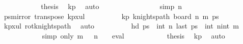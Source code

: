 \begin{isabellebody}
\ \ \ \ \ \ \ \ \isamarkupfalse%
\ \isamarkupfalse%
\ {\isacharquery}{\kern0pt}thesis\ \isamarkupfalse%
\ kp\ \isamarkupfalse%
\ auto\isanewline
\ \ \ \ \ \ \isamarkupfalse%
\isanewline
\ \ \ \ \ \ \ \ \isamarkupfalse%
\ {\isacharbrackleft}{\kern0pt}simp{\isacharbrackright}{\kern0pt}{\isacharcolon}{\kern0pt}\ {\isachardoublequoteopen}n\ {\isacharequal}{\kern0pt}\ {}{\isachardoublequoteclose}\isanewline
\ \ \ \ \ \ \ \ \isamarkupfalse%
\ {\isacharquery}{\kern0pt}ps{\isacharequal}{\kern0pt}{\isachardoublequoteopen}mirror{}\ {\isacharparenleft}{\kern0pt}transpose\ kp{}x{}ul{\isacharparenright}{\kern0pt}{\isachardoublequoteclose}\isanewline
\ \ \ \ \ \ \ \ \isamarkupfalse%
\ kp{\isacharcolon}{\kern0pt}\ {\isachardoublequoteopen}knights{\isacharunderscore}{\kern0pt}path\ {\isacharparenleft}{\kern0pt}board\ n\ m{\isacharparenright}{\kern0pt}\ {\isacharquery}{\kern0pt}ps{\isachardoublequoteclose}\isanewline
\ \ \ \ \ \ \ \ \ \ \isamarkupfalse%
\ kp{\isacharunderscore}{\kern0pt}{}x{}{\isacharunderscore}{\kern0pt}ul\ rot{}{}{\isacharunderscore}{\kern0pt}knights{\isacharunderscore}{\kern0pt}path\ \isamarkupfalse%
\ auto\isanewline
\ \ \ \ \ \ \ \ \isamarkupfalse%
\ {\isachardoublequoteopen}hd\ {\isacharquery}{\kern0pt}ps\ {\isacharequal}{\kern0pt}\ {\isacharparenleft}{\kern0pt}int\ n{\isacharcomma}{\kern0pt}{}{\isacharparenright}{\kern0pt}{\isachardoublequoteclose}\ {\isachardoublequoteopen}last\ {\isacharquery}{\kern0pt}ps\ {\isacharequal}{\kern0pt}\ {\isacharparenleft}{\kern0pt}int\ n{\isacharminus}{\kern0pt}{}{\isacharcomma}{\kern0pt}int\ m{\isacharminus}{\kern0pt}{}{\isacharparenright}{\kern0pt}{\isachardoublequoteclose}\isanewline
\ \ \ \ \ \ \ \ \ \ \isamarkupfalse%
\ {\isacharparenleft}{\kern0pt}simp\ only{\isacharcolon}{\kern0pt}\ {\isacartoucheopen}m\ {\isacharequal}{\kern0pt}\ {}{\isacartoucheclose}\ {\isacartoucheopen}n\ {\isacharequal}{\kern0pt}\ {}{\isacartoucheclose}\ {\isacharbar}{\kern0pt}\ eval{\isacharparenright}{\kern0pt}{\isacharplus}{\kern0pt}\isanewline
\ \ \ \ \ \ \ \ \isamarkupfalse%
\ \isamarkupfalse%
\ {\isacharquery}{\kern0pt}thesis\ \isamarkupfalse%
\ kp\ \isamarkupfalse%
\ auto\isanewline
\ \ \ \ \ \ \isamarkupfalse%

\end{isabellebody}
